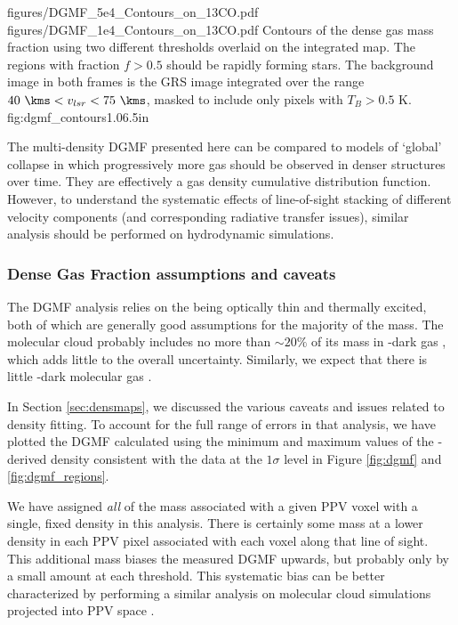 \FigureTwoAA
{figures/DGMF_5e4_Contours_on_13CO.pdf}
{figures/DGMF_1e4_Contours_on_13CO.pdf}
{Contours of the dense gas mass fraction using two different thresholds
overlaid on the integrated \thirteenco map.  The regions with fraction $f>0.5$
should be rapidly forming stars.  The background image in both frames is the
GRS \thirteenco image integrated over the range $40~\kms < v_{lsr} < 75~\kms$,
masked to include only pixels with $T_B>0.5$ K.}
{fig:dgmf_contours}{1.0}{6.5in}

The multi-density DGMF presented here can be compared to models of `global'
collapse in which progressively more gas should be observed in denser structures
over time.  They are effectively a gas density cumulative distribution function.
However, to understand the systematic effects of line-of-sight stacking of
different velocity components (and corresponding radiative transfer issues),
similar analysis should be performed on hydrodynamic simulations.

\subsubsection{Dense Gas Fraction assumptions and caveats}

The DGMF analysis relies on the \thirteenco being optically thin and thermally
excited, both of which are generally good assumptions for the majority of the
mass.  The molecular cloud probably includes no more than $\sim20\%$ of its mass
in \twelveco-dark gas \citep{Pineda2013b,Langer2014b,Smith2014b}, which adds little to
the overall uncertainty.  Similarly, we expect that there is little 
\thirteenco-dark molecular gas \citep[the ratio of \twelveco to \thirteenco
should not vary significantly in molecular clouds;][]{Visser2009a}.

In Section \ref{sec:densmaps}, we discussed the various caveats and issues
related to \formaldehyde density fitting.  To account for the full range of
errors in that analysis, we have plotted the DGMF calculated using the minimum
and maximum values of the \formaldehyde-derived density consistent with the
data at the $1\sigma$ level in Figure \ref{fig:dgmf} and
\ref{fig:dgmf_regions}.

We have assigned \emph{all} of the mass associated with a given PPV voxel with
a single, fixed density in this analysis.  There is certainly some mass at a
lower density in each PPV pixel associated with each voxel along that line of
sight.  This additional mass biases the measured DGMF upwards,
but probably only by a small amount at each
threshold.  This systematic bias can be better characterized by performing a
similar analysis on molecular cloud simulations projected into PPV space
\citep[as demonstrated for other analysis techniques by][]{Beaumont2013a}.


